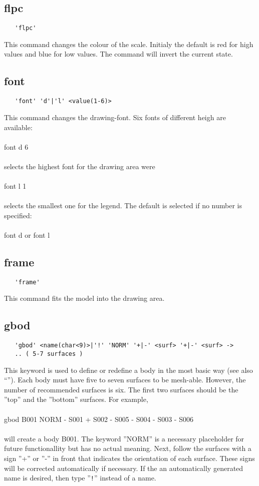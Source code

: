 \documentclass{article}
\begin{document}
\subsection{\label{flpc}flpc}
\begin{verbatim}
   'flpc'
\end{verbatim}
This command changes the colour of the scale. Initialy the default is red for high values and blue for low values. The command will invert the current state.

\subsection{\label{font}font}
\begin{verbatim}
   'font' 'd'|'l' <value(1-6)>
\end{verbatim}
This command changes the drawing-font. Six fonts of different heigh are available:
\\\\font d 6\\\\selects the highest font for the drawing area were\\\\font l 1\\\\selects the smallest one for the legend. The default is selected if no number is specified:\\\\font d or font l

\subsection{\label{frame}frame}
\begin{verbatim}
   'frame' 
\end{verbatim}
This command fits the model into the drawing area. 

\subsection{\label{gbod}gbod}
\begin{verbatim}
   'gbod' <name(char<9)>|'!' 'NORM' '+|-' <surf> '+|-' <surf> ->
   .. ( 5-7 surfaces )
\end{verbatim}
This keyword is used to define or redefine a body in the most basic way (see also ``''). Each body must have five to seven surfaces to be mesh-able. However, the number of recommended surfaces is six. The first two surfaces should be the ''top'' and the ''bottom'' surfaces. For example,\\\\gbod B001 NORM - S001 + S002 - S005 - S004 - S003 - S006\\\\will create a body B001. The keyword ''NORM'' is a necessary placeholder for future functionallity but has no actual meaning. Next, follow the surfaces with a sign ''+'' or ''-'' in front that indicates the orientation of each surface. These signs will be corrected automatically if necessary. If the an automatically generated name is desired, then type ''\verb_!_'' instead of a name.
\end{document}
